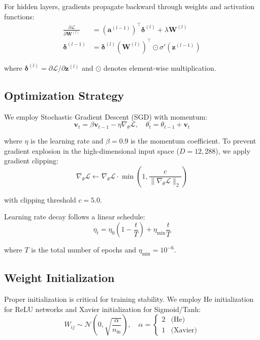 \documentclass[sigconf,nonacm]{acmart}
\begin{document}
For hidden layers, gradients propagate backward through weights and activation functions:
\begin{align}
\frac{\partial \mathcal{L}}{\partial \mathbf{W}^{(l)}} &= (\mathbf{a}^{(l-1)})^\top \boldsymbol{\delta}^{(l)} + \lambda \mathbf{W}^{(l)} \\
\boldsymbol{\delta}^{(l-1)} &= \boldsymbol{\delta}^{(l)} (\mathbf{W}^{(l)})^\top \odot \sigma'(\mathbf{z}^{(l-1)})
\end{align}

where $\boldsymbol{\delta}^{(l)} = \partial \mathcal{L} / \partial \mathbf{z}^{(l)}$ and $\odot$ denotes element-wise multiplication.

\subsection{Optimization Strategy}

We employ Stochastic Gradient Descent (SGD) with momentum:
\begin{equation}
\mathbf{v}_t = \beta \mathbf{v}_{t-1} - \eta \nabla_\theta \mathcal{L}, \quad \theta_t = \theta_{t-1} + \mathbf{v}_t
\end{equation}

where $\eta$ is the learning rate and $\beta=0.9$ is the momentum coefficient. To prevent gradient explosion in the high-dimensional input space ($D=12,288$), we apply gradient clipping:
\begin{equation}
\nabla_\theta \mathcal{L} \leftarrow \nabla_\theta \mathcal{L} \cdot \min\left(1, \frac{c}{\|\nabla_\theta \mathcal{L}\|_2}\right)
\end{equation}

with clipping threshold $c=5.0$.

Learning rate decay follows a linear schedule:
\begin{equation}
\eta_t = \eta_0 \left(1 - \frac{t}{T}\right) + \eta_{\min}\frac{t}{T}
\end{equation}

where $T$ is the total number of epochs and $\eta_{\min} = 10^{-6}$.

\subsection{Weight Initialization}

Proper initialization is critical for training stability. We employ He initialization for ReLU networks and Xavier initialization for Sigmoid/Tanh:
\begin{equation}
W_{ij} \sim \mathcal{N}\left(0, \sqrt{\frac{\alpha}{n_{\text{in}}}}\right), \quad \alpha = \begin{cases} 2 & \text{(He)} \\ 1 & \text{(Xavier)} \end{cases}
\end{equation}
\end{document}
